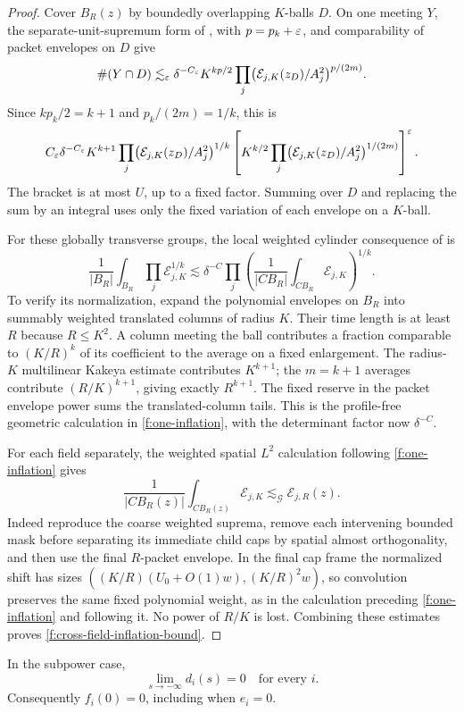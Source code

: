 \begin{proof}
Cover $B_R(z)$ by boundedly overlapping $K$-balls $D$. On one
meeting $Y$, the separate-unit-supremum form of
, with $p=p_k+\varepsilon$, and comparability of
packet envelopes on $D$ give
\[
 \#(Y\cap D)\lesssim_\varepsilon\delta^{-C_\varepsilon}K^{kp/2}
   \prod_j\bigl(\mathcal E_{j,K}(z_D)/A_j^2\bigr)^{p/(2m)}.
\]
Since $kp_k/2=k+1$ and $p_k/(2m)=1/k$, this is
\[
 C_\varepsilon\delta^{-C_\varepsilon}K^{k+1}
 \prod_j\bigl(\mathcal E_{j,K}(z_D)/A_j^2\bigr)^{1/k}
 \left[K^{k/2}\prod_j
       \bigl(\mathcal E_{j,K}(z_D)/A_j^2\bigr)^{1/(2m)}
 \right]^\varepsilon.
\]
The bracket is at most $U$, up to a fixed factor. Summing over
$D$ and replacing the sum by an integral uses only the fixed
variation of each envelope on a $K$-ball.

For these globally transverse groups, the local weighted cylinder
consequence of  is
\[
 \frac1{|B_R|}\int_{B_R}\prod_j\mathcal E_{j,K}^{1/k}
 \lesssim\delta^{-C}
 \prod_j\left(\frac1{|CB_R|}
                 \int_{CB_R}\mathcal E_{j,K}\right)^{1/k}.
\]
To verify its normalization, expand the polynomial envelopes on
$B_R$ into summably weighted translated columns of radius $K$.
Their time length is at least $R$ because $R\le K^2$. A column
meeting the ball contributes a fraction comparable to $(K/R)^k$
of its coefficient to the average on a fixed enlargement. The
radius-$K$ multilinear Kakeya estimate contributes $K^{k+1}$;
the $m=k+1$ averages contribute $(R/K)^{k+1}$, giving exactly
$R^{k+1}$. The fixed reserve in the packet envelope power sums
the translated-column tails. This is the profile-free geometric
calculation in \eqref{f:one-inflation}, with the determinant factor
now $\delta^{-C}$.

For each field separately, the weighted spatial $L^2$ calculation
following \eqref{f:one-inflation} gives
\[
 \frac1{|CB_R(z)|}\int_{CB_R(z)}\mathcal E_{j,K}
 \lesssim_{\mathcal G}\mathcal E_{j,R}(z).
\]
Indeed reproduce the coarse weighted suprema, remove each
intervening bounded mask before separating its immediate child
caps by spatial almost orthogonality, and then use the final
$R$-packet envelope. In the final cap frame the normalized shift
has sizes $((K/R)(U_0+O(1)w),(K/R)^2w)$, so convolution preserves
the same fixed polynomial weight, as in the calculation preceding
\eqref{f:one-inflation} and following it. No power of $R/K$ is
lost. Combining these estimates proves
\eqref{f:cross-field-inflation-bound}.
\end{proof}

\begin{lemma}\label{f:left-limit}
In the subpower case,
\begin{equation}\label{f:left-limit-eq}
 \lim_{s\to-\infty}d_i(s)=0
 \quad\text{for every }i.
\end{equation}
Consequently $f_i(0)=0$, including when $e_i=0$.
\end{lemma}

